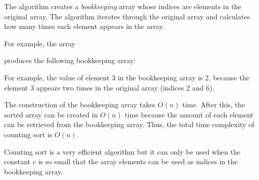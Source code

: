 The algorithm creates a \emph{bookkeeping} array
whose indices are elements in the original array.
The algorithm iterates through the original array
and calculates how many times each element
appears in the array.

For example, the array
\begin{center}
\end{center}
produces the following bookkeeping array:
\begin{center}
\end{center}

For example, the value of element 3
in the bookkeeping array is 2,
because the element 3 appears two times
in the original array (indices 2 and 6).

The construction of the bookkeeping array
takes $O(n)$ time. After this, the sorted array
can be created in $O(n)$ time because
the amount of each element can be retrieved
from the bookkeeping array.
Thus, the total time complexity of counting
sort is $O(n)$.

Counting sort is a very efficient algorithm
but it can only be used when the constant $c$
is so small that the array elements can
be used as indices in the bookkeeping array.

